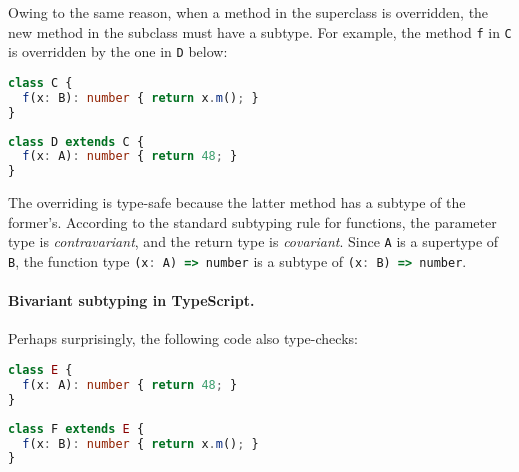 \noindent
Owing to the same reason, when a method in the superclass is overridden, the new
method in the subclass must have a subtype. For example, the method
\lstinline{f} in \lstinline{C} is overridden by the one in \lstinline{D} below:

\noindent
\begin{minipage}{.5\textwidth}
\begin{lstlisting}[language=TypeScript]
class C {
  f(x: B): number { return x.m(); }
}
\end{lstlisting}
\end{minipage}%
\begin{minipage}{.5\textwidth}
\begin{lstlisting}[language=TypeScript]
class D extends C {
  f(x: A): number { return 48; }
}
\end{lstlisting}
\end{minipage}

\noindent
The overriding is type-safe because the latter method has a subtype of the
former's. According to the standard subtyping rule for functions, the parameter
type is \emph{contravariant}, and the return type is \emph{covariant}. Since
\lstinline{A} is a supertype of \lstinline{B}, the function type
\lstinline[language=TypeScript]{(x: A) => number} is a subtype of
\lstinline[language=TypeScript]{(x: B) => number}.

\paragraph{Bivariant subtyping in TypeScript.}
Perhaps surprisingly, the following code also type-checks:

\noindent
\begin{minipage}{.5\textwidth}
\begin{lstlisting}[language=TypeScript]
class E {
  f(x: A): number { return 48; }
}
\end{lstlisting}
\end{minipage}%
\begin{minipage}{.5\textwidth}
\begin{lstlisting}[language=TypeScript]
class F extends E {
  f(x: B): number { return x.m(); }
}
\end{lstlisting}
\end{minipage}

